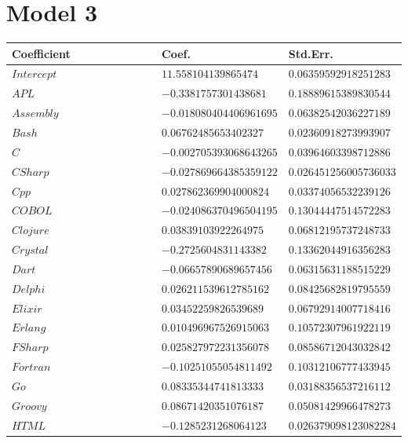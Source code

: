 \documentclass{report}
\begin{document}
\section{Model 3}

\label{data:model3}

\begin{longtable}{|R{0.4\linewidth}|R{0.3\linewidth}|R{0.3\linewidth}|}
  \hline
  \textbf{Coefficient} & \textbf{Coef.} & \textbf{Std.Err.} \\

  \hline
  $Intercept$ & $11.558104139865474$ & $0.06359592918251283$\\
  \hline
  $APL$ & $-0.3381757301438681$ & $0.18889615389830544$\\
  \hline
  $Assembly$ & $-0.018080404406961695$ & $0.06382542036227189$\\
  \hline
  $Bash$ & $0.06762485653402327$ & $0.02360918273993907$\\
  \hline
  $C$ & $-0.002705393068643265$ & $0.03964603398712886$\\
  \hline
  $CSharp$ & $-0.027869664385359122$ & $0.026451256005736033$\\
  \hline
  $Cpp$ & $0.027862369904000824$ & $0.03374056532239126$\\
  \hline
  $COBOL$ & $-0.024086370496504195$ & $0.13044447514572283$\\
  \hline
  $Clojure$ & $0.03839103922264975$ & $0.06812195737248733$\\
  \hline
  $Crystal$ & $-0.2725604831143382$ & $0.13362044916356283$\\
  \hline
  $Dart$ & $-0.06657890689657456$ & $0.06315631188515229$\\
  \hline
  $Delphi$ & $0.026211539612785162$ & $0.08425682819795559$\\
  \hline
  $Elixir$ & $0.03452259826539689$ & $0.06792914007718416$\\
  \hline
  $Erlang$ & $0.010496967526915063$ & $0.10572307961922119$\\
  \hline
  $FSharp$ & $0.025827972231356078$ & $0.08586712043032842$\\
  \hline
  $Fortran$ & $-0.10251055054811492$ & $0.10312106777433945$\\
  \hline
  $Go$ & $0.08335344741813333$ & $0.03188356537216112$\\
  \hline
  $Groovy$ & $0.08671420351076187$ & $0.05081429966478273$\\
  \hline
  $HTML$ & $-0.1285231268064123$ & $0.026379098123082284$\\

\end{longtable}
\end{document}
